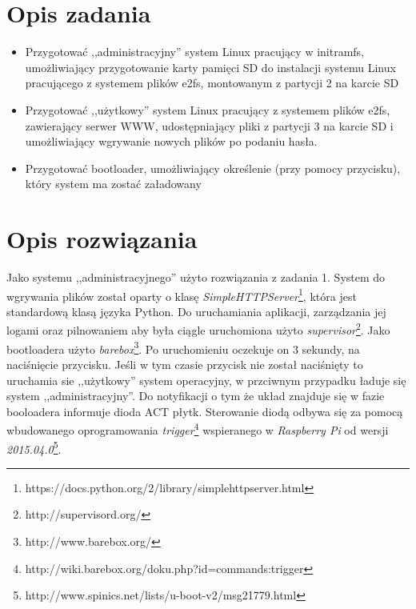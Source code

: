 
\usepackage{listings}

\maketitle
\tableofcontents

\newpage

\section{Opis zadania}
\begin{itemize}
\item Przygotować ,,administracyjny'' system Linux pracujący w 
initramfs, umożliwiający przygotowanie karty pamięci SD do 
instalacji systemu Linux pracującego z systemem plików 
e2fs, montowanym z partycji 2 na karcie SD

\item Przygotować ,,użytkowy'' system Linux pracujący z 
systemem plików e2fs, zawierający serwer WWW, 
udostępniający pliki z partycji 3 na karcie SD i umożliwiający 
wgrywanie nowych plików po podaniu hasła.

\item Przygotować bootloader, umożliwiający 
określenie (przy pomocy przycisku), który system ma zostać 
załadowany
\end{itemize}

\section{Opis rozwiązania}
Jako systemu ,,administracyjnego'' użyto rozwiązania z zadania 1.
System do wgrywania plików został oparty o klasę \emph{SimpleHTTPServer}\footnote{https://docs.python.org/2/library/simplehttpserver.html},
która jest standardową klasą języka Python. Do uruchamiania aplikacji, zarządzania
jej logami oraz pilnowaniem aby była ciągle uruchomiona użyto \emph{supervisor}\footnote{http://supervisord.org/}.
Jako bootloadera użyto \emph{barebox}\footnote{http://www.barebox.org/}.
Po uruchomieniu oczekuje on 3 sekundy, na
naciśnięcie przycisku. Jeśli w tym czasie przycisk nie został naciśnięty to
uruchamia sie ,,użytkowy'' system operacyjny, w przciwnym przypadku
ładuje się system ,,administracyjny''.
Do notyfikacji o tym że układ znajduje się w fazie booloadera informuje dioda ACT
płytk. Sterowanie diodą odbywa się za pomocą wbudowanego oprogramowania \emph{trigger}\footnote{http://wiki.barebox.org/doku.php?id=commands:trigger}
wspieranego w \emph{Raspberry Pi} od wersji \emph{2015.04.0}\footnote{http://www.spinics.net/lists/u-boot-v2/msg21779.html}.

